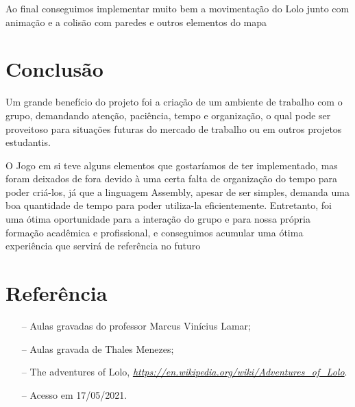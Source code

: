 \documentclass[10pt, conference, compsocconf]{IEEEtran}
\begin{document}
Ao final conseguimos implementar muito bem a movimentação do Lolo junto com
animação e a colisão com paredes e outros elementos do mapa

\section{Conclusão}
Um grande benefício do projeto foi a criação de um ambiente de trabalho com o
grupo, demandando atenção, paciência, tempo e organização, o qual pode ser
proveitoso para situações futuras do mercado de trabalho ou em outros projetos
estudantis.

O Jogo em si teve alguns elementos que gostaríamos de ter implementado, mas
foram deixados de fora devido à uma certa falta de organização do tempo para
poder criá-los, já que a linguagem Assembly, apesar de ser simples, demanda uma
boa quantidade de tempo para poder utiliza-la eficientemente. Entretanto, foi
uma ótima oportunidade para a interação do grupo e para nossa própria formação
acadêmica e profissional, e conseguimos acumular uma ótima experiência que
servirá de referência no futuro


\section{Referência}
\label{sec:Conclusao}
\begin{itemize}
    \item[--] Aulas gravadas do professor Marcus Vinícius Lamar;
    \item[--] Aulas gravada de Thales Menezes;
    \item[--] The adventures of Lolo, \textit{\url{https://en.wikipedia.org/wiki/Adventures_of_Lolo}}.
    \item[--] Acesso em 17/05/2021.
    
\end{itemize}



%


\end{document}
